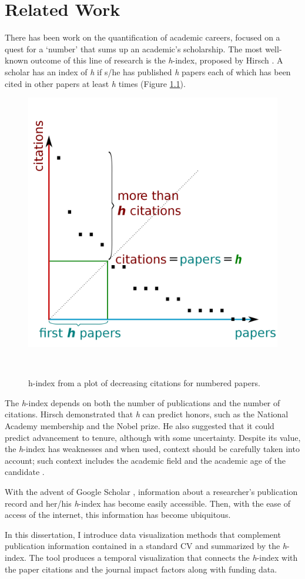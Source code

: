 \chapter{Related Work}\label{chap:Related Work}

There has been work on the quantification of academic careers, focused on a quest for a `number' that sums up an academic's scholarship. The most well-known outcome of this line of research is the {\it h}-index, proposed by Hirsch \cite{Hirsch:2005}. A scholar has an index of {\it h} if s/he has published {\it h} papers each of which has been cited in other papers at least {\it h} times (Figure \ref{fig-hindex}).

\begin{figure}
    \centering
    \includegraphics[width=.3\textwidth]{figures/H-index.png}
    \caption{h-index from a plot of decreasing citations for numbered papers.}~\label{fig-hindex}
\end{figure}


The {\it h}-index depends on both the number of publications and the number of citations. Hirsch demonstrated that {\it h} can predict honors, such as the National Academy membership and the Nobel prize. He also suggested that it could predict advancement to tenure, although with some uncertainty.
Despite its value, the {\it h}-index has weaknesses and when used, context should be carefully taken into account; such context includes the academic field and the academic age of the candidate \cite{Bornmann2}.

With the advent of Google Scholar \cite{Googl82:online}, information about a researcher's publication record and her/his {\it h}-index has become easily accessible. Then, with the ease of access of the internet, this information has become ubiquitous.

In this dissertation, I introduce data visualization methods that complement publication information contained in a standard CV and summarized by the {\it h}-index. The tool produces a temporal visualization that connects the {\it h}-index with the paper citations and the journal impact factors along with funding data.

